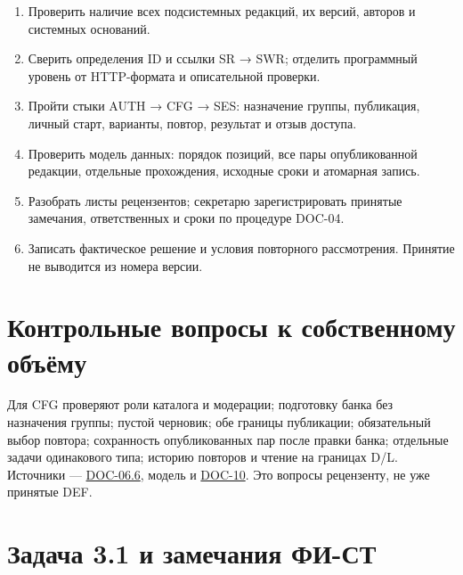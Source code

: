\documentclass[12pt,a4paper]{article}
\newcommand{\tightlist}{\setlength{\itemsep}{0pt}\setlength{\parskip}{0pt}}
\begin{document}
\hypertarget{маршрут-рассмотрения}{}

\begin{enumerate}
\def\labelenumi{\arabic{enumi}.}
\tightlist
\item
  Проверить наличие всех подсистемных редакций, их версий, авторов и системных оснований.
\item
  Сверить определения ID и ссылки SR → SWR; отделить программный уровень от HTTP-формата и описательной проверки.
\item
  Пройти стыки AUTH → CFG → SES: назначение группы, публикация, личный старт, варианты, повтор, результат и отзыв доступа.
\item
  Проверить модель данных: порядок позиций, все пары опубликованной редакции, отдельные прохождения, исходные сроки и атомарная запись.
\item
  Разобрать листы рецензентов; секретарю зарегистрировать принятые замечания, ответственных и сроки по процедуре DOC-04.
\item
  Записать фактическое решение и условия повторного рассмотрения. Принятие не выводится из номера версии.
\end{enumerate}

\section{Контрольные вопросы к собственному объёму}\label{ux43aux43eux43dux442ux440ux43eux43bux44cux43dux44bux435-ux432ux43eux43fux440ux43eux441ux44b-ux43a-ux441ux43eux431ux441ux442ux432ux435ux43dux43dux43eux43cux443-ux43eux431ux44aux451ux43cux443}

\hypertarget{контрольные-вопросы-к-собственному-объёму}{}

Для CFG проверяют роли каталога и модерации; подготовку банка без назначения группы; пустой черновик; обе границы публикации; обязательный выбор повтора; сохранность опубликованных пар после правки банка; отдельные задачи одинакового типа; историю повторов и чтение на границах D/L. Источники --- {\href{../07\_Программные\_требования/DOC-06.6\_Конфигурации\_и\_модерация.pdf\#doc-066-шаблоны-наборов-задач-и-модерация}{DOC-06.6}}, модель и {\href{../10\_Верификация\_и\_тестирование/DOC-10\_План\_верификации.pdf\#doc-10-план-верификации-программного-обеспечения}{DOC-10}}. Это вопросы рецензенту, не уже принятые DEF.

\section{Задача 3.1 и замечания ФИ-СТ}\label{ux437ux430ux434ux430ux447ux430-31-ux438-ux437ux430ux43cux435ux447ux430ux43dux438ux44f-ux444ux438-ux441ux442}
\end{document}
